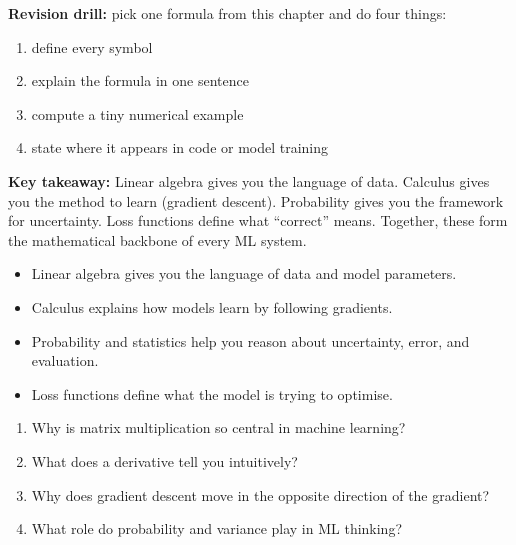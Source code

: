 \documentclass[12pt, a4paper, oneside]{book}
\begin{document}
\begin{exercisebox}
\textbf{Revision drill:} pick one formula from this chapter and do four things:
\begin{enumerate}[leftmargin=2em]
    \item define every symbol
    \item explain the formula in one sentence
    \item compute a tiny numerical example
    \item state where it appears in code or model training
\end{enumerate}
\end{exercisebox}

\begin{tipbox}
\textbf{Key takeaway:} Linear algebra gives you the language of data. Calculus gives you the method to learn (gradient descent). Probability gives you the framework for uncertainty. Loss functions define what ``correct'' means. Together, these form the mathematical backbone of every ML system.
\end{tipbox}

\begin{summarybox}
\begin{itemize}[leftmargin=2em]
    \item Linear algebra gives you the language of data and model parameters.
    \item Calculus explains how models learn by following gradients.
    \item Probability and statistics help you reason about uncertainty, error, and evaluation.
    \item Loss functions define what the model is trying to optimise.
\end{itemize}
\end{summarybox}

\begin{recallbox}
\begin{enumerate}[leftmargin=2em]
    \item Why is matrix multiplication so central in machine learning?
    \item What does a derivative tell you intuitively?
    \item Why does gradient descent move in the opposite direction of the gradient?
    \item What role do probability and variance play in ML thinking?
\end{enumerate}
\end{recallbox}
\end{document}
